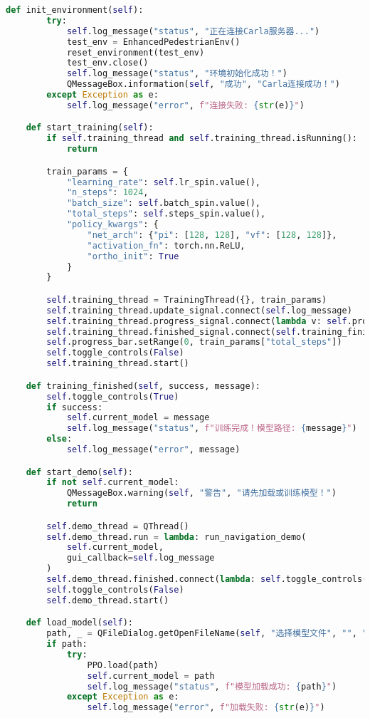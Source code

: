 \begin{lstlisting}[language=Python]
    def init_environment(self):
        try:
            self.log_message("status", "正在连接Carla服务器...")
            test_env = EnhancedPedestrianEnv()
            reset_environment(test_env)
            test_env.close()
            self.log_message("status", "环境初始化成功！")
            QMessageBox.information(self, "成功", "Carla连接成功！")
        except Exception as e:
            self.log_message("error", f"连接失败: {str(e)}")

    def start_training(self):
        if self.training_thread and self.training_thread.isRunning():
            return

        train_params = {
            "learning_rate": self.lr_spin.value(),
            "n_steps": 1024,
            "batch_size": self.batch_spin.value(),
            "total_steps": self.steps_spin.value(),
            "policy_kwargs": {
                "net_arch": {"pi": [128, 128], "vf": [128, 128]},
                "activation_fn": torch.nn.ReLU,
                "ortho_init": True
            }
        }

        self.training_thread = TrainingThread({}, train_params)
        self.training_thread.update_signal.connect(self.log_message)
        self.training_thread.progress_signal.connect(lambda v: self.progress_bar.setValue(v))
        self.training_thread.finished_signal.connect(self.training_finished)
        self.progress_bar.setRange(0, train_params["total_steps"])
        self.toggle_controls(False)
        self.training_thread.start()

    def training_finished(self, success, message):
        self.toggle_controls(True)
        if success:
            self.current_model = message
            self.log_message("status", f"训练完成！模型路径: {message}")
        else:
            self.log_message("error", message)

    def start_demo(self):
        if not self.current_model:
            QMessageBox.warning(self, "警告", "请先加载或训练模型！")
            return

        self.demo_thread = QThread()
        self.demo_thread.run = lambda: run_navigation_demo(
            self.current_model,
            gui_callback=self.log_message
        )
        self.demo_thread.finished.connect(lambda: self.toggle_controls(True))
        self.toggle_controls(False)
        self.demo_thread.start()

    def load_model(self):
        path, _ = QFileDialog.getOpenFileName(self, "选择模型文件", "", "ZIP Files (*.zip)")
        if path:
            try:
                PPO.load(path)
                self.current_model = path
                self.log_message("status", f"模型加载成功: {path}")
            except Exception as e:
                self.log_message("error", f"加载失败: {str(e)}")


\end{lstlisting}
